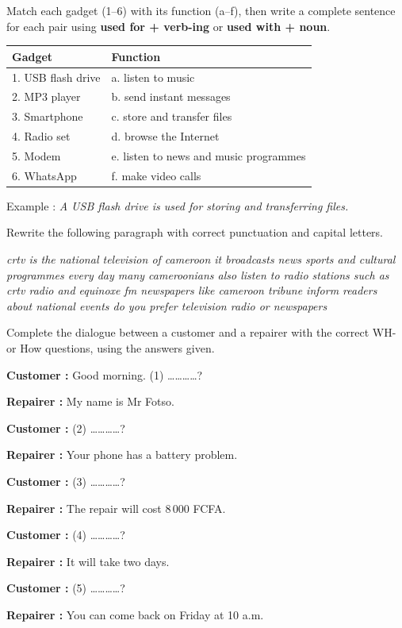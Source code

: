 \documentclass[11pt]{article}
\begin{document}
\begin{exercice}
Match each gadget (1--6) with its function (a--f), then write a complete sentence for each pair using \textbf{used for + verb-ing} or \textbf{used with + noun}.

\begin{center}
\begin{tabularx}{\linewidth}{|l|X|}
\hline
\rowcolor{popblueL} \textbf{Gadget} & \textbf{Function} \\
\hline
1. USB flash drive & a. listen to music \\
\hline
2. MP3 player & b. send instant messages \\
\hline
3. Smartphone & c. store and transfer files \\
\hline
4. Radio set & d. browse the Internet \\
\hline
5. Modem & e. listen to news and music programmes \\
\hline
6. WhatsApp & f. make video calls \\
\hline
\end{tabularx}
\end{center}

Example : \emph{A USB flash drive is used for storing and transferring files.}
\end{exercice}

\begin{exercice}
Rewrite the following paragraph with correct punctuation and capital letters.

\emph{crtv is the national television of cameroon it broadcasts news sports and cultural programmes every day many cameroonians also listen to radio stations such as crtv radio and equinoxe fm newspapers like cameroon tribune inform readers about national events do you prefer television radio or newspapers}
\end{exercice}

\begin{exercice}
Complete the dialogue between a customer and a repairer with the correct WH- or How questions, using the answers given.

\textbf{Customer :} Good morning. (1) \ldots\ldots\ldots\ldots ?

\textbf{Repairer :} My name is Mr Fotso.

\textbf{Customer :} (2) \ldots\ldots\ldots\ldots ?

\textbf{Repairer :} Your phone has a battery problem.

\textbf{Customer :} (3) \ldots\ldots\ldots\ldots ?

\textbf{Repairer :} The repair will cost 8\,000 FCFA.

\textbf{Customer :} (4) \ldots\ldots\ldots\ldots ?

\textbf{Repairer :} It will take two days.

\textbf{Customer :} (5) \ldots\ldots\ldots\ldots ?

\textbf{Repairer :} You can come back on Friday at 10 a.m.
\end{exercice}
\end{document}
